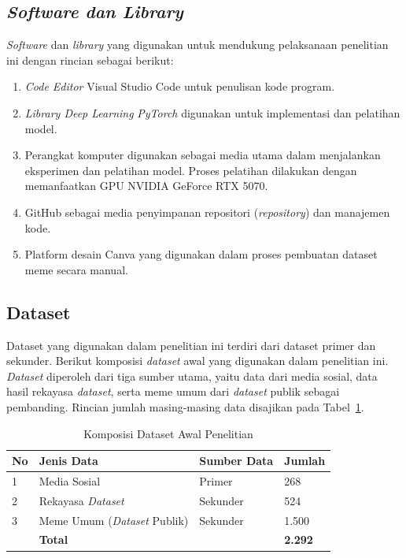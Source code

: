 \subsection{\textit{Software dan Library}} \label{subsec:software_dan_library}
\textit{Software} dan \textit{library} yang digunakan untuk mendukung pelaksanaan penelitian ini dengan rincian sebagai berikut:
\begin{enumerate}[noitemsep]
    \item \textit{Code Editor} Visual Studio Code untuk penulisan kode program.
    \item \textit{Library Deep Learning} \textit{PyTorch} digunakan untuk implementasi dan pelatihan model.
    \item Perangkat komputer digunakan sebagai media utama dalam menjalankan eksperimen dan pelatihan model. Proses pelatihan dilakukan dengan memanfaatkan GPU NVIDIA GeForce RTX 5070.
    \item GitHub sebagai media penyimpanan repositori (\textit{repository}) dan manajemen kode.
    \item Platform desain Canva yang digunakan dalam proses pembuatan dataset meme secara manual.
\end{enumerate}

\subsection{Dataset} \label{subsec:dataset}
Dataset yang digunakan dalam penelitian ini terdiri dari dataset primer dan sekunder. Berikut komposisi \textit{dataset} awal yang digunakan dalam penelitian ini. \textit{Dataset} diperoleh dari tiga sumber utama, yaitu data  dari media sosial, data hasil rekayasa \textit{dataset}, serta meme umum dari \textit{dataset} publik sebagai pembanding. Rincian jumlah masing-masing data disajikan pada Tabel~\ref{tabel:komposisi_dataset}.

\begin{table}[H]
    \centering
    \caption{Komposisi Dataset Awal Penelitian}
    \label{tabel:komposisi_dataset}
    \small
    \setlength{\tabcolsep}{3pt}
    \renewcommand{\arraystretch}{1.1}
    \begin{tabular}{p{0.6cm} p{3.8cm} p{1.6cm} p{1.4cm}}
        \hline
        \textbf{No} & {\raggedright \textbf{Jenis Data}\par} & \textbf{Sumber Data} & \textbf{Jumlah} \\
        \hline
        1 & {\raggedright Media Sosial\par} & Primer & 268 \\
        2 & {\raggedright Rekayasa \textit{Dataset}\par} & Sekunder & 524 \\
        3 & {\raggedright Meme Umum (\textit{Dataset} Publik)\par} & Sekunder & 1.500 \\
        \hline
        & {\raggedright \textbf{Total}\par} & & \textbf{2.292} \\
        \hline
    \end{tabular}
\end{table}

